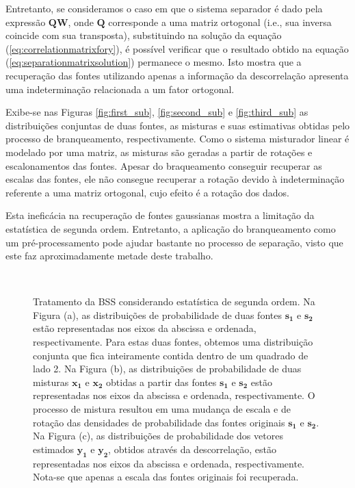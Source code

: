     Entretanto, se consideramos o caso em que o sistema separador é dado pela expressão $\mathbf{QW}$, onde $\mathbf{Q}$ corresponde a uma matriz ortogonal (i.e., sua inversa coincide com sua transposta), substituindo na solução da equação (\ref{eq:correlationmatrixfory}), é possível verificar que o resultado obtido na equação (\ref{eq:separationmatrixsolution}) permanece o mesmo. Isto mostra que a recuperação das fontes utilizando apenas a informação da descorrelação apresenta uma indeterminação relacionada a um fator ortogonal.
    
    Exibe-se nas Figuras \ref{fig:first_sub}, \ref{fig:second_sub} e \ref{fig:third_sub} as distribuições conjuntas de duas fontes, as misturas e suas estimativas obtidas pelo processo de branqueamento, respectivamente. Como o sistema misturador linear é modelado por uma matriz, as misturas são geradas a partir de rotações e escalonamentos das fontes. Apesar do braqueamento conseguir recuperar as escalas das fontes, ele não consegue recuperar a rotação devido à indeterminação referente a uma matriz ortogonal, cujo efeito é a rotação dos dados.
    
    Esta ineficácia na recuperação de fontes gaussianas mostra a limitação da estatística de segunda ordem. Entretanto, a aplicação do branqueamento como um pré-processamento pode ajudar bastante no processo de separação, visto que este faz aproximadamente metade deste trabalho.
    
\begin{figure}
    \centering
    \\
    \caption{Tratamento da BSS considerando estatística de segunda ordem. Na Figura (a), as distribuições de probabilidade de duas fontes $\mathbf{s_1}$ e $\mathbf{s_2}$ estão representadas nos eixos da abscissa e ordenada, respectivamente. Para estas duas fontes, obtemos uma distribuição conjunta que fica inteiramente contida dentro de um quadrado de lado 2. Na Figura (b), as distribuições de probabilidade de duas misturas $\mathbf{x_1}$ e $\mathbf{x_2}$ obtidas a partir das fontes $\mathbf{s_1}$ e $\mathbf{s_2}$ estão representadas nos eixos da abscissa e ordenada, respectivamente. O processo de mistura resultou em uma mudança de escala e de rotação das densidades de probabilidade das fontes originais $\mathbf{s_1}$ e $\mathbf{s_2}$. Na Figura (c), as distribuições de probabilidade dos vetores estimados $\mathbf{y_1}$ e $\mathbf{y_2}$, obtidos através da descorrelação, estão representadas nos eixos da abscissa e ordenada, respectivamente. Nota-se que apenas a escala das fontes originais foi recuperada. }
    \label{fig:sample_subfigures}
\end{figure}


